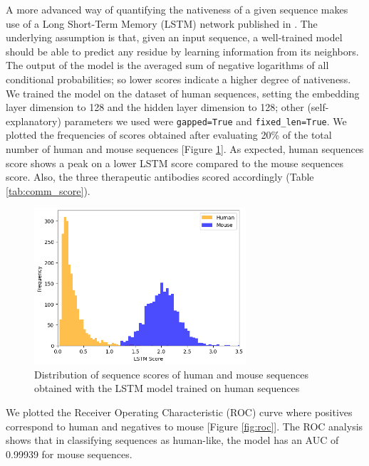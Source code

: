 \documentclass[11pt]{article}
\begin{document}
A more advanced way of quantifying the nativeness of a given sequence makes use of a Long Short-Term Memory (LSTM) network published in \cite{LSTM}. The underlying assumption is that, given an input sequence, a well-trained model should be able to predict any residue by learning information from its neighbors. The output of the model is the averaged sum of negative logarithms of all conditional probabilities; so lower scores indicate a higher degree of nativeness. We trained the model on the dataset of human sequences, setting the embedding layer dimension to 128 and the hidden layer dimension to 128; other (self-explanatory) parameters we used were \verb|gapped=True| and \verb|fixed_len=True|. We plotted the frequencies of scores obtained after evaluating 20\% of the total number of human and mouse sequences [Figure \ref{fig:lstm_scores}]. As expected, human sequences score shows a peak on a lower LSTM score compared to the mouse sequences score. Also, the three therapeutic antibodies scored accordingly (Table \ref{tab:comm_score}).

\begin{figure}[th]
    \centering
    \includegraphics[width=0.7\textwidth]{images/score_plot.png}
    \caption{\small Distribution of sequence scores of human and mouse sequences obtained with the LSTM model trained on human sequences}
    \label{fig:lstm_scores}
\end{figure}

We plotted the Receiver Operating Characteristic (ROC) curve where positives correspond to human and negatives to mouse [Figure \ref{fig:roc}].
The ROC analysis shows that in classifying sequences as human-like, the model has an AUC of 0.99939 for mouse sequences.
\end{document}
